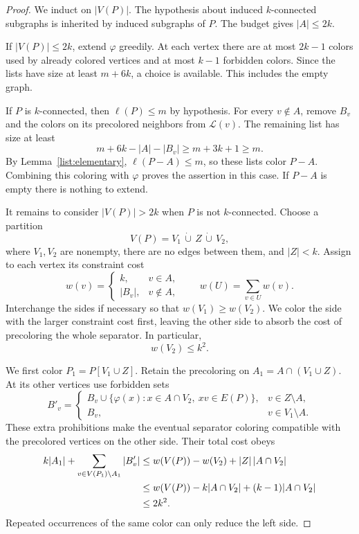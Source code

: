 \begin{proof}
We induct on $|V(P)|$. The hypothesis about induced $k$-connected subgraphs
is inherited by induced subgraphs of $P$. The budget gives $|A|\le2k$.

If $|V(P)|\le2k$, extend $\varphi$ greedily. At each vertex there are at
most $2k-1$ colors used by already colored vertices and at most $k-1$
forbidden colors. Since the lists have size at least $m+6k$, a choice is
available. This includes the empty graph.

If $P$ is $k$-connected, then $\ell(P)\le m$ by hypothesis. For every
$v\notin A$, remove $B_v$ and the colors on its precolored neighbors from
$\mathcal L(v)$. The remaining list has size at least
\[
m+6k-|A|-|B_v|\ge m+3k+1\ge m.
\]
By Lemma~\ref{list:elementary}, $\ell(P-A)\le m$, so these lists color
$P-A$. Combining this coloring with $\varphi$ proves the assertion in
this case. If $P-A$ is empty there is nothing to extend.

It remains to consider $|V(P)|>2k$ when $P$ is not $k$-connected. Choose
a partition
\[
V(P)=V_1\,\dot\cup\,Z\,\dot\cup\,V_2,
\]
where $V_1,V_2$ are nonempty, there are no edges between them, and
$|Z|<k$. Assign to each vertex its constraint cost
\[
w(v)=
\begin{cases}
k,&v\in A,\\
|B_v|,&v\notin A,
\end{cases}
\qquad
w(U)=\sum_{v\in U}w(v).
\]
Interchange the sides if necessary so that $w(V_1)\ge w(V_2)$.
We color the side with the larger constraint cost first, leaving the
other side to absorb the cost of precoloring the whole separator.
In particular,
\begin{equation}\label{list:eq-second-side-cost}
w(V_2)\le k^2.
\end{equation}

We first color $P_1=P[V_1\cup Z]$. Retain the precoloring on
$A_1=A\cap(V_1\cup Z)$. At its other vertices use forbidden sets
\[
B'_v=
\begin{cases}
B_v\cup\{\varphi(x):x\in A\cap V_2,\ xv\in E(P)\},&v\in Z\setminus A,\\
B_v,&v\in V_1\setminus A.
\end{cases}
\]
These extra prohibitions make the eventual separator coloring compatible
with the precolored vertices on the other side. Their total cost obeys
\begin{align}
k|A_1|+\sum_{v\in V(P_1)\setminus A_1}|B'_v|
&\le w(V(P))-w(V_2)+|Z|\,|A\cap V_2|\notag\\
&\le w(V(P))-k|A\cap V_2|+(k-1)|A\cap V_2|\notag\\
&\le2k^2.
\label{list:eq-first-side-cost}
\end{align}
Repeated occurrences of the same color can only reduce the left side.


\end{proof}
